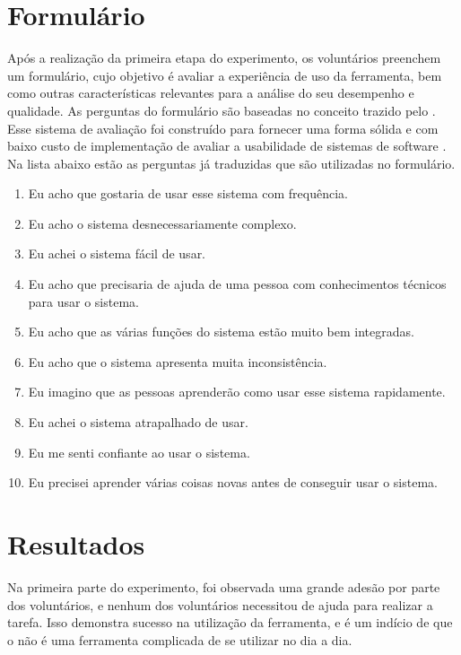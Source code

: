 \documentclass[12pt]{tcc}
\begin{document}
	\section{Formulário}
	\label{section:parte-2-formulario}

	Após a realização da primeira etapa do experimento, os voluntários preenchem um formulário, cujo objetivo é avaliar a experiência de uso da ferramenta, bem como outras características relevantes para a análise do seu desempenho e qualidade. As perguntas do formulário são baseadas no conceito trazido pelo . Esse sistema de avaliação foi construído para fornecer uma forma sólida e com baixo custo de implementação de avaliar a usabilidade de sistemas de software \citep{brooke1995sus}. Na lista abaixo estão as perguntas já traduzidas que são utilizadas no formulário.

	\begin{enumerate}
		\itemsep 0em 

		\item Eu acho que gostaria de usar esse sistema com frequência.
		\item Eu acho o sistema desnecessariamente complexo.
		\item Eu achei o sistema fácil de usar.
		\item Eu acho que precisaria de ajuda de uma pessoa com conhecimentos técnicos para usar o sistema.
		\item Eu acho que as várias funções do sistema estão muito bem integradas.
		\item Eu acho que o sistema apresenta muita inconsistência.
		\item Eu imagino que as pessoas aprenderão como usar esse sistema rapidamente.
		\item Eu achei o sistema atrapalhado de usar.
		\item Eu me senti confiante ao usar o sistema.
		\item Eu precisei aprender várias coisas novas antes de conseguir usar o sistema.
	\end{enumerate}


	\section{Resultados}
	\label{section:resultados}

	Na primeira parte do experimento, foi observada uma grande adesão por parte dos voluntários, e nenhum dos voluntários necessitou de ajuda para realizar a tarefa. Isso demonstra sucesso na utilização da ferramenta, e é um indício de que o  não é uma ferramenta complicada de se utilizar no dia a dia.
\end{document}
